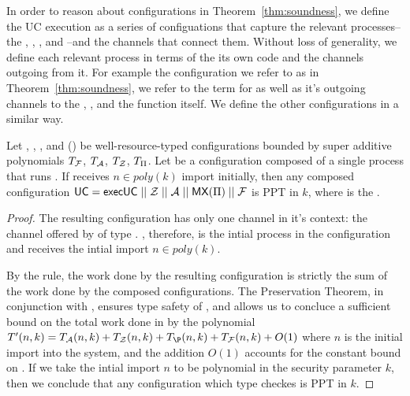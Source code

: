 In order to reason about configurations in Theorem~\ref{thm:soundness}, we define the UC execution as a series of configuations that capture the relevant processes--the \partywrapper, \Z, \F, and \A--and the channels that connect them.
Without loss of generality, we define each relevant process in terms of the its own code and the channels outgoing from it. 
For example the configuration we refer to as \Z in Theorem~\ref{thm:soundness}, we refer to the term for \Z as well as it's outgoing channels to the \partywrapper, \A, and the  function itself. We define the other configurations in a similar way.

\begin{theorem} \label{thm:soundness}
Let \F, \A, \Z, and (\PI) be well-resource-typed configurations bounded by super additive polynomials $T_\mathcal{F}$, $T_\mathcal{A}$, $T_\mathcal{Z}$, $T_\Pi$. Let  be a configuration composed of a single process that runs . If  receives $n \in poly(k)$ import initially, then any composed configuration $\mathsf{UC} = \mathsf{execUC} \; || \; \mathcal{Z} \; || \; \mathcal{A} \; || \; \mathsf{MX}(\Pi) \; || \; \mathcal{F}$ is PPT in $k$, where  is the \partywrapper.
\end{theorem}

\begin{proof}
The resulting configuration  has only one channel in it's context: the channel offered by  of type . 
, therefore, is the intial process in the configuration and receives the intial import $n \in poly(k)$.

By the  rule, the work done by the resulting configuration is strictly the sum of the work done by the composed configurations. 
The Preservation Theorem, in conjunction with , ensures type safety of , and allows us to concluce a sufficient bound on the total work done in  by the polynomial $T'(n,k) = T_\A(n,k) + T_\Z(n,k) + T_\P(n,k) + T_\F(n,k) + O(1)$ where $n$ is the initial import into the system, and the addition $O(1)$ accounts for the constant bound on .
If we take the intial import $n$ to be polynomial in the security parameter $k$, then we conclude that any configuration  which type checkes is PPT in $k$.
\end{proof}

